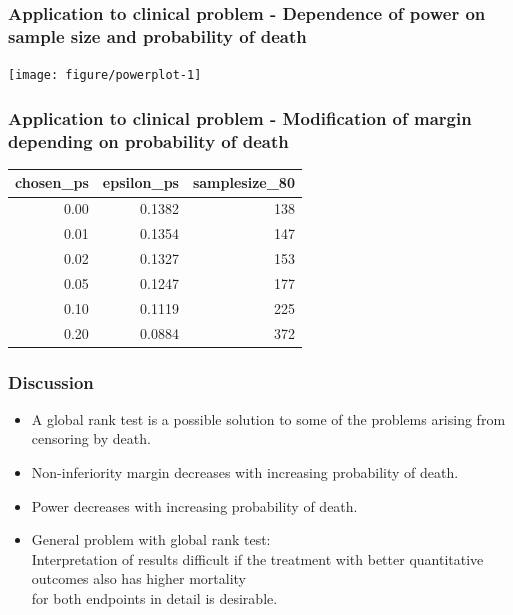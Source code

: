 \documentclass[xcolor=pdftex,dvipsnames,table]{beamer}\usepackage[]{graphicx}\usepackage[]{color}
\newenvironment{knitrout}{}{} %
\begin{document}
\begin{frame}[fragile] %
\frametitle{Application to clinical problem - Dependence of power on sample size and probability of death}

\begin{knitrout}
\color{fgcolor}
\texttt{[image: figure/powerplot-1]} 

\end{knitrout}
\end{frame}

\begin{frame}[fragile] %
\frametitle{Application to clinical problem - Modification of margin depending on probability of death}

\begin{table}[ht]
\centering
\begin{tabular}{rrr}
  \hline
chosen\_ps & epsilon\_ps & samplesize\_80 \\ 
  \hline
0.00 & 0.1382 & 138 \\ 
  0.01 & 0.1354 & 147 \\ 
  0.02 & 0.1327 & 153 \\ 
  0.05 & 0.1247 & 177 \\ 
  0.10 & 0.1119 & 225 \\ 
  0.20 & 0.0884 & 372 \\ 
   \hline
\end{tabular}
\end{table}

\end{frame}

\begin{frame} %
\frametitle{Discussion}
\begin{itemize}
\item A global rank test is a possible solution to some of the problems arising from censoring by death.
\item Non-inferiority margin decreases with increasing probability of death.
\item Power decreases with increasing probability of death.
\item General problem with global rank test: \\
      Interpretation of results difficult if the treatment with better quantitative outcomes also has higher mortality \\
for both endpoints in detail is desirable.
\end{itemize}
\end{frame}
\end{document}
